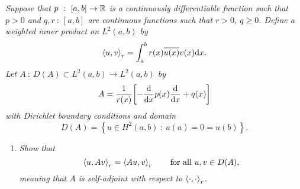 \emph{Suppose that $p\ :\ [a,b]\rightarrow \mathbb{R}$ is a continuously differentiable function such that $p > 0$ and $q,r\ :\ [a,b]$ are continuous functions such that $r > 0$, $q \geq 0$.  Define a weighted inner product on $L^2(a,b)$ by $$\left\langle u, v \right\rangle_r = \int_a^b r(x) \overline{u(x)}v(x) \dd x.$$  Let $A\ :\ D(A) \subset L^2(a,b) \rightarrow L^2(a,b)$ by $$A = \frac{1}{r(x)}\qty[-\frac{\dd}{\dd x}p(x) \frac{\dd}{\dd x} + q(x)]$$ with Dirichlet boundary conditions and domain $$D(A) = \left\{u \in H^2(a,b)\ :\ u(a) = 0 = u(b)\right\}.$$}
\begin{enumerate}[\bf (a)]
    \item
        \emph{Show that $$\left\langle u, Av \right\rangle_r = \left\langle Au, v \right\rangle_r \qquad \text{for all } u, v \in D(A),$$ meaning that $A$ is self-adjoint with respect to $\left\langle \cdot, \cdot \right\rangle_r$.} \\


\end{enumerate}
